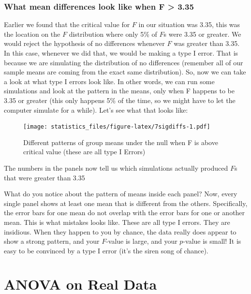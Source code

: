 \documentclass[]{book}
\begin{document}
\hypertarget{what-mean-differences-look-like-when-f-3.35}{%
\subsubsection{What mean differences look like when F \textgreater{} 3.35}\label{what-mean-differences-look-like-when-f-3.35}}

Earlier we found that the critical value for \(F\) in our situation was 3.35, this was the location on the \(F\) distribution where only 5\% of \(F\)s were 3.35 or greater. We would reject the hypothesis of no differences whenever \(F\) was greater than 3.35. In this case, whenever we did that, we would be making a type I error. That is because we are simulating the distribution of no differences (remember all of our sample means are coming from the exact same distribution). So, now we can take a look at what type I errors look like. In other words, we can run some simulations and look at the pattern in the means, only when F happens to be 3.35 or greater (this only happens 5\% of the time, so we might have to let the computer simulate for a while). Let's see what that looks like:

\begin{figure}
\centering
\texttt{[image: statistics\_files/figure-latex/7sigdiffs-1.pdf]}
\caption{\label{fig:7sigdiffs}Different patterns of group means under the null when F is above critical value (these are all type I Errors)}
\end{figure}

The numbers in the panels now tell us which simulations actually produced \(F\)s that were greater than 3.35

What do you notice about the pattern of means inside each panel? Now, every single panel shows at least one mean that is different from the others. Specifically, the error bars for one mean do not overlap with the error bars for one or another mean. This is what mistakes looks like. These are all type I errors. They are insidious. When they happen to you by chance, the data really does appear to show a strong pattern, and your \(F\)-value is large, and your \(p\)-value is small! It is easy to be convinced by a type I error (it's the siren song of chance).

\hypertarget{anova-on-real-data}{%
\section{ANOVA on Real Data}\label{anova-on-real-data}}
\end{document}
